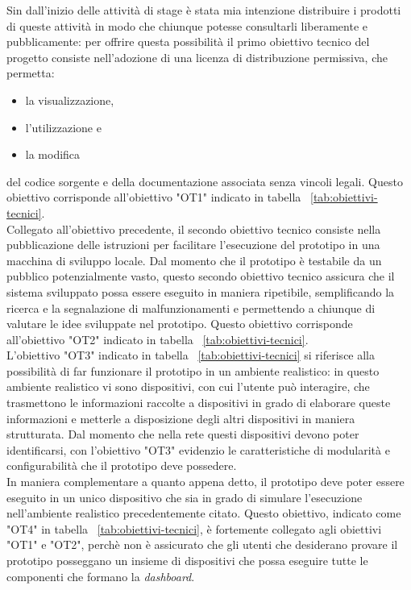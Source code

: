 Sin dall'inizio delle attività di stage è stata mia intenzione distribuire i prodotti di queste attività in modo che chiunque potesse consultarli liberamente e pubblicamente: per offrire questa possibilità il primo obiettivo tecnico del progetto consiste nell'adozione di una licenza di distribuzione permissiva, che permetta:
\begin{itemize}
  \item la visualizzazione,
  \item l'utilizzazione e
  \item la modifica
\end{itemize}
del codice sorgente e della documentazione associata senza vincoli legali. Questo obiettivo corrisponde all'obiettivo "OT1" indicato in tabella ~\ref{tab:obiettivi-tecnici}. \\
Collegato all'obiettivo precedente, il secondo obiettivo tecnico consiste nella pubblicazione delle istruzioni per facilitare l'esecuzione del prototipo in una macchina di sviluppo locale.
Dal momento che il prototipo è testabile da un pubblico potenzialmente vasto, questo secondo obiettivo tecnico assicura che il sistema sviluppato possa essere eseguito in maniera ripetibile, semplificando la ricerca e la segnalazione di malfunzionamenti e permettendo a chiunque di valutare le idee sviluppate nel prototipo. Questo obiettivo corrisponde all'obiettivo "OT2" indicato in tabella ~\ref{tab:obiettivi-tecnici}. \\
L'obiettivo "OT3" indicato in tabella ~\ref{tab:obiettivi-tecnici} si riferisce alla possibilità di far funzionare il prototipo in un ambiente realistico: in questo ambiente realistico vi sono dispositivi, con cui l'utente può interagire, che trasmettono le informazioni raccolte a dispositivi in grado di elaborare queste informazioni e metterle a disposizione degli altri dispositivi in maniera strutturata. Dal momento che nella rete questi dispositivi devono poter identificarsi, con l'obiettivo "OT3" evidenzio le caratteristiche di modularità e configurabilità che il prototipo deve possedere. \\
In maniera complementare a quanto appena detto, il prototipo deve poter essere eseguito in un unico dispositivo che sia in grado di simulare l'esecuzione nell'ambiente realistico precedentemente citato. Questo obiettivo, indicato come "OT4" in tabella ~\ref{tab:obiettivi-tecnici}, è fortemente collegato agli obiettivi "OT1" e "OT2", perchè non è assicurato che gli utenti che desiderano provare il prototipo posseggano un insieme di dispositivi che possa eseguire tutte le componenti che formano la \emph{dashboard}. \\
